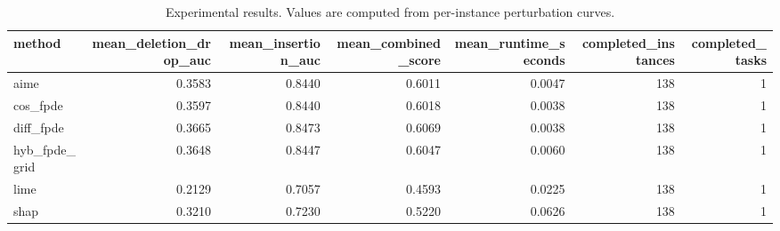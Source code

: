 \begin{table}[t]
\caption{Experimental results. Values are computed from per-instance perturbation curves.}
\label{tab:main_results_computed}
\centering
\begin{tabular}{lrrrrrr}
\toprule
method & mean\_deletion\_drop\_auc & mean\_insertion\_auc & mean\_combined\_score & mean\_runtime\_seconds & completed\_instances & completed\_tasks \\
\midrule
aime & 0.3583 & 0.8440 & 0.6011 & 0.0047 & 138 & 1 \\
cos\_fpde & 0.3597 & 0.8440 & 0.6018 & 0.0038 & 138 & 1 \\
diff\_fpde & 0.3665 & 0.8473 & 0.6069 & 0.0038 & 138 & 1 \\
hyb\_fpde\_grid & 0.3648 & 0.8447 & 0.6047 & 0.0060 & 138 & 1 \\
lime & 0.2129 & 0.7057 & 0.4593 & 0.0225 & 138 & 1 \\
shap & 0.3210 & 0.7230 & 0.5220 & 0.0626 & 138 & 1 \\
\bottomrule
\end{tabular}

\end{table}
